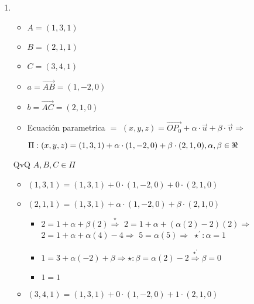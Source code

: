 \documentclass[../practica_01.tex]{subfiles}
\begin{document}
    \begin{enumerate}
        \item
            \begin{itemize}
                \item $A= (1,3,1)$
                \item $B= (2,1,1)$
                \item $C= (3,4,1)$
                \item $a = \overrightarrow{AB} = (1,-2,0) $
                \item $b = \overrightarrow{AC} = (2,1,0) $
                
                \item Ecuación parametrica $= $
                    $(x,y,z) = \overrightarrow{OP_0} + \alpha\cdot\overrightarrow{u} + \beta\cdot\overrightarrow{v} \Rightarrow$

                    $\Pi : (x,y,z) = (1,3,1) + \alpha \cdot (1,-2,0) + \beta \cdot (2,1,0), \alpha,\beta \in \real$

            \end{itemize}

            QvQ $A, B, C \in \Pi$
            \begin{itemize}
                \item $(1,3,1) = (1,3,1) + 0 \cdot (1,-2,0) + 0 \cdot (2,1,0)$
                \item $(2,1,1) = (1,3,1) + \alpha \cdot (1,-2,0) + \beta \cdot (2,1,0)$
                
                    \begin{itemize}
                        \item $2 = 1 + \alpha + \beta(2) \stackrel{\star}{\Rightarrow}$
                                $ 2 =  1 + \alpha + (\alpha(2)-2)(2) \Rightarrow$
                                $ 2 = 1 + \alpha + \alpha(4) - 4 \Rightarrow $
                                $ 5 = \alpha(5) \Rightarrow $
                                $ \star^{\prime}: \alpha = 1 $
                        \item $1 = 3 + \alpha(-2) + \beta \Rightarrow \star: \beta = \alpha(2)-2 \stackrel{\star^{\prime}}{\Rightarrow} \beta = 0$
                        \item $1 = 1 $
                    \end{itemize}

                \item $(3,4,1) = (1,3,1) + 0 \cdot (1,-2,0) + 1 \cdot (2,1,0)$
            \end{itemize}


\end{enumerate}
\end{document}

